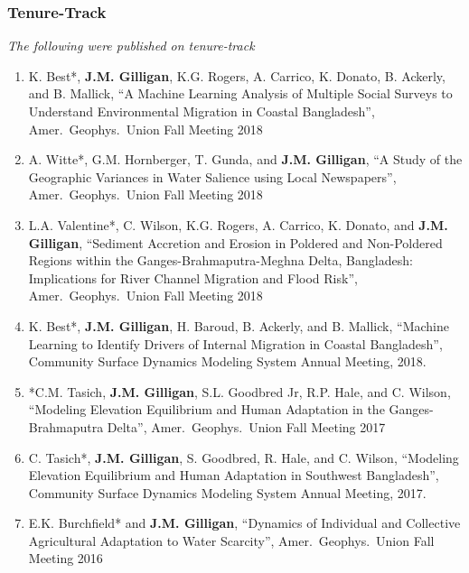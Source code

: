 %
%
\subsubsection{Tenure-Track}
\emph{The following were published on tenure-track}

\begin{enumerate}
    \item 
    K. Best*, \textbf{J.M. Gilligan}, K.G. Rogers, A. Carrico, K. Donato, B. Ackerly, and B. Mallick,
    \enquote{A Machine Learning Analysis of Multiple Social Surveys to Understand Environmental Migration in Coastal Bangladesh},
    Amer.\ Geophys.\ Union Fall Meeting 2018

    \item 
    A. Witte*, G.M. Hornberger, T. Gunda, and \textbf{J.M. Gilligan},
    \enquote{A Study of the Geographic Variances in Water Salience using Local Newspapers},
    Amer.\ Geophys.\ Union Fall Meeting 2018
    
    \item 
    L.A. Valentine*,  C. Wilson, K.G. Rogers, A. Carrico, K. Donato, and \textbf{J.M. Gilligan},
    \enquote{Sediment Accretion and Erosion in Poldered and Non-Poldered Regions within the 
        Ganges-Brahmaputra-Meghna Delta, Bangladesh: Implications for River Channel Migration and Flood Risk},
    Amer.\ Geophys.\ Union Fall Meeting 2018
    
    \item 
    K. Best*, \textbf{J.M. Gilligan}, H. Baroud, B. Ackerly, and B. Mallick,
    \enquote{Machine Learning to Identify Drivers of Internal Migration in Coastal Bangladesh},
    Community Surface Dynamics Modeling System Annual Meeting, 2018.
    
    \item 
    *C.M. Tasich, \textbf{J.M. Gilligan}, S.L. Goodbred Jr, R.P. Hale, and C. Wilson,
    \enquote{Modeling Elevation Equilibrium and Human Adaptation in the Ganges-Brahmaputra Delta},
    Amer.\ Geophys.\ Union Fall Meeting 2017
    
    \item 
    C. Tasich*, \textbf{J.M. Gilligan}, S. Goodbred, R. Hale, and C. Wilson,
    \enquote{Modeling Elevation Equilibrium and Human Adaptation in Southwest Bangladesh},
    Community Surface Dynamics Modeling System Annual Meeting, 2017.

    \item 
    E.K. Burchfield* and \textbf{J.M. Gilligan},
    \enquote{Dynamics of Individual and Collective Agricultural Adaptation to Water Scarcity},
    Amer.\ Geophys.\ Union Fall Meeting 2016
    

\end{enumerate}
